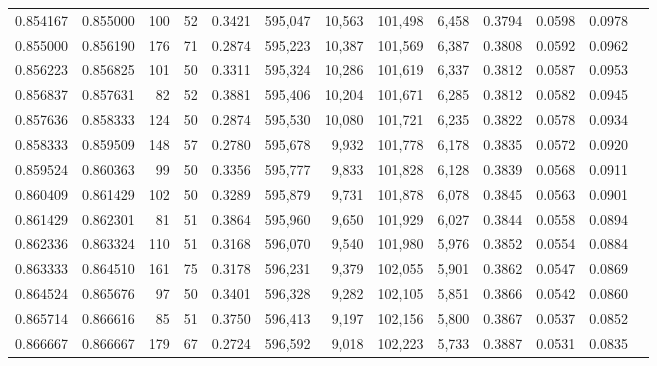 \begin{tabular}{rrrrrrrrrrrrr}
0.854167 & 0.855000 &    100 &    52 &                                     0.3421 & 595,047 &  10,563 & 101,498 &   6,458 & 0.3794 & 0.0598 & 0.0978 \\
0.855000 & 0.856190 &    176 &    71 &                                     0.2874 & 595,223 &  10,387 & 101,569 &   6,387 & 0.3808 & 0.0592 & 0.0962 \\
0.856223 & 0.856825 &    101 &    50 &                                     0.3311 & 595,324 &  10,286 & 101,619 &   6,337 & 0.3812 & 0.0587 & 0.0953 \\
0.856837 & 0.857631 &     82 &    52 &                                     0.3881 & 595,406 &  10,204 & 101,671 &   6,285 & 0.3812 & 0.0582 & 0.0945 \\
0.857636 & 0.858333 &    124 &    50 &                                     0.2874 & 595,530 &  10,080 & 101,721 &   6,235 & 0.3822 & 0.0578 & 0.0934 \\
0.858333 & 0.859509 &    148 &    57 &                                     0.2780 & 595,678 &   9,932 & 101,778 &   6,178 & 0.3835 & 0.0572 & 0.0920 \\
0.859524 & 0.860363 &     99 &    50 &                                     0.3356 & 595,777 &   9,833 & 101,828 &   6,128 & 0.3839 & 0.0568 & 0.0911 \\
0.860409 & 0.861429 &    102 &    50 &                                     0.3289 & 595,879 &   9,731 & 101,878 &   6,078 & 0.3845 & 0.0563 & 0.0901 \\
0.861429 & 0.862301 &     81 &    51 &                                     0.3864 & 595,960 &   9,650 & 101,929 &   6,027 & 0.3844 & 0.0558 & 0.0894 \\
0.862336 & 0.863324 &    110 &    51 &                                     0.3168 & 596,070 &   9,540 & 101,980 &   5,976 & 0.3852 & 0.0554 & 0.0884 \\
0.863333 & 0.864510 &    161 &    75 &                                     0.3178 & 596,231 &   9,379 & 102,055 &   5,901 & 0.3862 & 0.0547 & 0.0869 \\
0.864524 & 0.865676 &     97 &    50 &                                     0.3401 & 596,328 &   9,282 & 102,105 &   5,851 & 0.3866 & 0.0542 & 0.0860 \\
0.865714 & 0.866616 &     85 &    51 &                                     0.3750 & 596,413 &   9,197 & 102,156 &   5,800 & 0.3867 & 0.0537 & 0.0852 \\
0.866667 & 0.866667 &    179 &    67 &                                     0.2724 & 596,592 &   9,018 & 102,223 &   5,733 & 0.3887 & 0.0531 & 0.0835 \\

\end{tabular}

